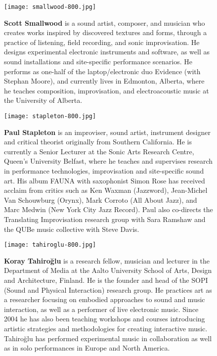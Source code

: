 \begin{authbio}
\begin{figure}[H]
  \sidecaption[t]
  \texttt{[image: smallwood-800.jpg]}
  \caption{\textbf{Scott Smallwood} is a sound artist, composer, and musician who creates works inspired by discovered textures and forms, through a practice of listening, field recording, and sonic improvisation. He designs experimental electronic instruments and software, as well as sound installations and site-specific performance scenarios. He performs as one-half of the laptop/electronic duo Evidence (with Stephan Moore), and currently lives in Edmonton, Alberta, where he teaches composition, improvisation, and electroacoustic music at the University of Alberta.}
\end{figure}

\begin{figure}[H]
  \sidecaption[t]
  \texttt{[image: stapleton-800.jpg]}
  \caption{\textbf{Paul Stapleton} is an improviser, sound artist, instrument designer and critical theorist originally from Southern California. He is currently a Senior Lecturer at the Sonic Arts Research Centre, Queen's University Belfast, where he teaches and supervises research in performance technologies, improvisation and site-specific sound art. His album FAUNA with saxophonist Simon Rose has received acclaim from critics such as Ken Waxman (Jazzword), Jean-Michel Van Schouwburg (Orynx), Mark Corroto (All About Jazz), and Marc Medwin (New York City Jazz Record). Paul also co-directs the Translating Improvisation research group with Sara Ramshaw and the QUBe music collective with Steve Davis.}
\end{figure}

\begin{figure}[H]
  \sidecaption[t]
  \texttt{[image: tahiroglu-800.jpg]}
  \caption{\textbf{Koray Tahiro\u{g}lu} is a research fellow, musician and lecturer in the Department of Media at the Aalto University School of Arts, Design and Architecture, Finland. He is the founder and head of the SOPI (Sound and Physical Interaction) research group. He practices art as a researcher focusing on embodied approaches to sound and music interaction, as well as a performer of live electronic music. Since 2004 he has also been teaching workshops and courses introducing artistic strategies and methodologies for creating interactive music. Tahiro\u{g}lu has performed experimental music in collaboration as well as in solo performances in Europe and North America.}
\end{figure}


\end{authbio}
